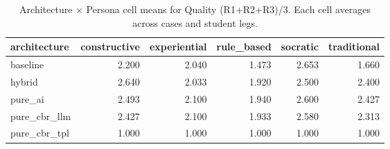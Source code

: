 \begin{table}[htbp]
\centering
\caption{Architecture $\times$ Persona cell means for Quality (R1+R2+R3)/3. Each cell averages across cases and student legs.}
\label{tab:cell-quality}
\begin{tabular}{lrrrrr}
\toprule
architecture & constructive & experiential & rule\_based & socratic & traditional \\
\midrule
baseline & 2.200 & 2.040 & 1.473 & 2.653 & 1.660 \\
hybrid & 2.640 & 2.033 & 1.920 & 2.500 & 2.400 \\
pure\_ai & 2.493 & 2.100 & 1.940 & 2.600 & 2.427 \\
pure\_cbr\_llm & 2.427 & 2.100 & 1.933 & 2.580 & 2.313 \\
pure\_cbr\_tpl & 1.000 & 1.000 & 1.000 & 1.000 & 1.000 \\
\bottomrule
\end{tabular}
\end{table}
